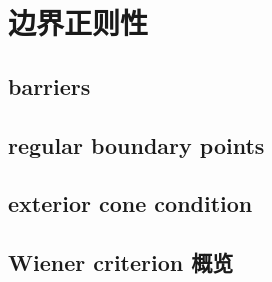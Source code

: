 \section{边界正则性}
\label{b3:sec:1603}


\subsection{barriers}
\label{b3:subsec:160301}

\subsection{regular boundary points}
\label{b3:subsec:160302}

\subsection{exterior cone condition}
\label{b3:subsec:160303}

\subsection{Wiener criterion 概览}
\label{b3:subsec:160304}


